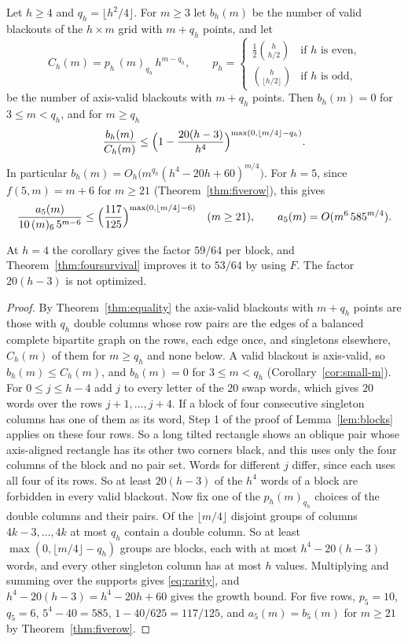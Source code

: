 \begin{corollary}\label{cor:rarity}
Let $h\ge4$ and $q_h=\lfloor h^2/4\rfloor$. For $m\ge3$ let $b_h(m)$ be the number of valid blackouts of the $h\times m$ grid with $m+q_h$ points, and let
\[
C_h(m)=p_h\,(m)_{q_h}\,h^{m-q_h},\qquad
p_h=\begin{cases}\tfrac12\binom{h}{h/2}&\text{if $h$ is even,}\\ \binom{h}{\lfloor h/2\rfloor}&\text{if $h$ is odd,}\end{cases}
\]
be the number of axis-valid blackouts with $m+q_h$ points. Then $b_h(m)=0$ for $3\le m<q_h$, and for $m\ge q_h$
\begin{equation}\label{eq:rarity}
\frac{b_h(m)}{C_h(m)}\le\Bigl(1-\frac{20(h-3)}{h^4}\Bigr)^{\max(0,\lfloor m/4\rfloor-q_h)} .
\end{equation}
In particular $b_h(m)=O_h\bigl(m^{q_h}(h^4-20h+60)^{m/4}\bigr)$. For $h=5$, since $f(5,m)=m+6$ for $m\ge21$ (Theorem~\ref{thm:fiverow}), this gives
\[
\frac{a_5(m)}{10\,(m)_6\,5^{m-6}}\le\Bigl(\frac{117}{125}\Bigr)^{\max(0,\lfloor m/4\rfloor-6)}\quad(m\ge21),\qquad a_5(m)=O(m^6\,585^{m/4}).
\]
\end{corollary}

At $h=4$ the corollary gives the factor $59/64$ per block, and Theorem~\ref{thm:foursurvival} improves it to $53/64$ by using $F$. The factor $20(h-3)$ is not optimized.

\begin{proof}
By Theorem~\ref{thm:equality} the axis-valid blackouts with $m+q_h$ points are those with $q_h$ double columns whose row pairs are the edges of a balanced complete bipartite graph on the rows, each edge once, and singletons elsewhere, $C_h(m)$ of them for $m\ge q_h$ and none below. A valid blackout is axis-valid, so $b_h(m)\le C_h(m)$, and $b_h(m)=0$ for $3\le m<q_h$ (Corollary~\ref{cor:small-m}). For $0\le j\le h-4$ add $j$ to every letter of the $20$ swap words, which gives $20$ words over the rows $j+1,\ldots,j+4$. If a block of four consecutive singleton columns has one of them as its word, Step 1 of the proof of Lemma~\ref{lem:blocks} applies on these four rows. So a long tilted rectangle shows an oblique pair whose axis-aligned rectangle has its other two corners black, and this uses only the four columns of the block and no pair set. Words for different $j$ differ, since each uses all four of its rows. So at least $20(h-3)$ of the $h^4$ words of a block are forbidden in every valid blackout. Now fix one of the $p_h(m)_{q_h}$ choices of the double columns and their pairs. Of the $\lfloor m/4\rfloor$ disjoint groups of columns $4k-3,\ldots,4k$ at most $q_h$ contain a double column. So at least $\max(0,\lfloor m/4\rfloor-q_h)$ groups are blocks, each with at most $h^4-20(h-3)$ words, and every other singleton column has at most $h$ values. Multiplying and summing over the supports gives \eqref{eq:rarity}, and $h^4-20(h-3)=h^4-20h+60$ gives the growth bound. For five rows, $p_5=10$, $q_5=6$, $5^4-40=585$, $1-40/625=117/125$, and $a_5(m)=b_5(m)$ for $m\ge21$ by Theorem~\ref{thm:fiverow}.
\end{proof}

